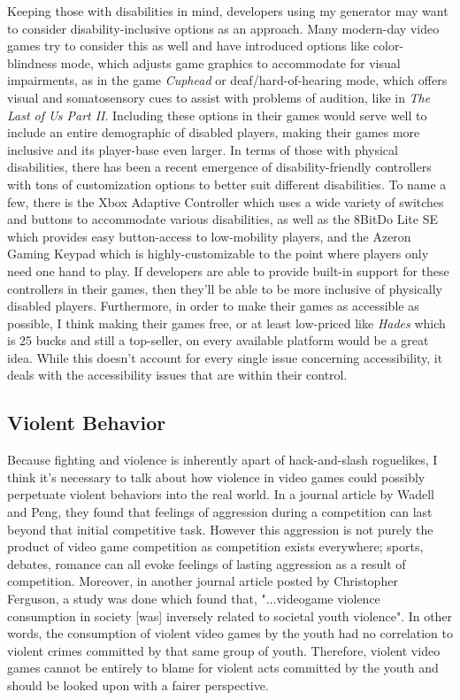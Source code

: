 \documentclass[10pt,twocolumn]{article}
\begin{document}
Keeping those with disabilities in mind, developers using my generator may want to consider disability-inclusive options as an approach. Many modern-day video games try to consider this as well and have introduced options like color-blindness mode, which adjusts game graphics to accommodate for visual impairments, as in the game \textit{Cuphead}\cite{cuphead} or deaf/hard-of-hearing mode, which offers visual and somatosensory cues to assist with  problems of audition, like in \textit{The Last of Us Part II}\cite{lastofus}. Including these options in their games would serve well to include an entire demographic of disabled players, making their games more inclusive and its player-base even larger. In terms of those with physical disabilities, there has been a recent emergence of disability-friendly controllers with tons of customization options to better suit different disabilities. To name a few, there is the Xbox Adaptive Controller \cite{xboxAdaptiveController} which uses a wide variety of switches and buttons to accommodate various disabilities, as well as the 8BitDo Lite SE \cite{8BitDo} which provides easy button-access to low-mobility players, and the Azeron Gaming Keypad \cite{azeron} which is highly-customizable to the point where players only need one hand to play. If developers are able to provide built-in support for these controllers in their games, then they'll be able to be more inclusive of physically disabled players. Furthermore, in order to make their games as accessible as possible, I think making their games free, or at least low-priced like \textit{Hades} which is 25 bucks and still a top-seller, on every available platform would be a great idea. While this doesn't account for every single issue concerning accessibility, it deals with the accessibility issues that are within their control.

\subsection{Violent Behavior}

Because fighting and violence is inherently apart of hack-and-slash roguelikes, I think it's necessary to talk about how violence in video games could possibly perpetuate violent behaviors into the real world. In a journal article by Wadell and Peng, they found that feelings of aggression during a competition can last beyond that initial competitive task\cite{wadell2014does}. However this aggression is not purely the product of video game competition as competition exists everywhere; sports, debates, romance can all evoke feelings of lasting aggression as a result of competition. Moreover, in another journal article posted by Christopher Ferguson, a study was done which found that, "...videogame violence consumption in society [was] inversely related to societal youth violence"\cite{ferguson2015depends}. In other words, the consumption of violent video games by the youth had no correlation to violent crimes committed by that same group of youth. Therefore, violent video games cannot be entirely to blame for violent acts committed by the youth and should be looked upon with a fairer perspective.
\end{document}
